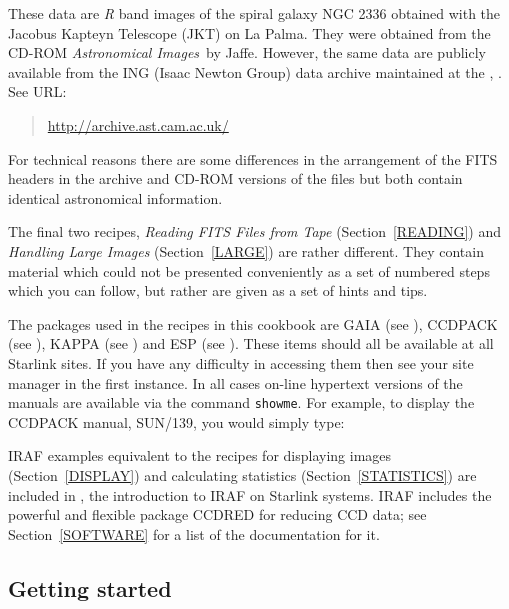 \documentclass[twoside,11pt]{starlink}
\begin{document}
These data are \textit{R}\/ band images of the spiral galaxy NGC 2336
obtained with the Jacobus Kapteyn Telescope (JKT) on La Palma.  They were
obtained from the CD-ROM \textit{Astronomical Images}\, by
Jaffe\cite{JAFFE98}.  However, the same data are publicly available from
the ING (Isaac Newton Group) data archive maintained at the
,
.
See URL:

\begin{quote}
\url{http://archive.ast.cam.ac.uk/}
\end{quote}

For technical reasons there are some differences in the arrangement of the
FITS headers in the archive and CD-ROM versions of the files but both
contain identical astronomical information.

The final two recipes, \textit{Reading FITS Files from Tape}\/
(Section~\ref{READING}) and \textit{Handling Large Images}\/
(Section~\ref{LARGE}) are rather different.  They contain material
which could not be presented conveniently as a set of numbered steps
which you can follow, but rather are given as a set of hints and tips.

The packages used in the recipes in this cookbook are
GAIA (see \/\cite{SUN214}),
CCDPACK (see \/\cite{SUN139}),
KAPPA (see \/\cite{SUN95}) and
ESP (see \/\cite{SUN180}).
These items should all be available at all Starlink sites.  If you have
any difficulty in accessing them then see your site manager in the first
instance.  In all cases on-line hypertext versions of the manuals are
available via the command \texttt{showme}.  For example, to display the
CCDPACK manual, SUN/139, you would simply type:

\begin{terminalv}
\end{terminalv}

IRAF examples equivalent to the recipes for displaying images
(Section~\ref{DISPLAY}) and calculating statistics (Section~\ref{STATISTICS})
are included in \/\cite{SG12}, the introduction to
IRAF on Starlink systems.  IRAF includes the powerful and flexible package
CCDRED for reducing CCD data; see Section~\ref{SOFTWARE} for a list of the
documentation for it.

\subsection{\label{START}Getting started}
\end{document}
